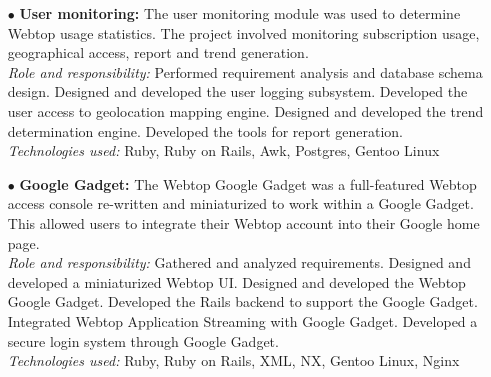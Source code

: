 \documentclass{scrartcl}
\begin{document}
\begin{cv}{
\href{http://www.develmj.com}{}
}
{\begin{itemize}
{      Ruby on Rails based framework. Configured and integrated
      ejabberd with the Rails backend. Designed and developed the user
      chat access rights engine.}\\
    \vspace{0.5em}
    \textsl{Technologies used:} {\scriptsize Ruby, Ruby on Rails,
      ejabberd, JWChat, XML}
\newpage
  \item[\footnotesize$\bullet$] \textbf{User monitoring: }{\scriptsize The user monitoring module was used to determine
    Webtop usage statistics. The project involved monitoring subscription usage,
    geographical access, report and trend generation.}\\

\vspace{0.5em}
    \textsl{Role and responsibility:} {\scriptsize Performed requirement
      analysis and database schema design. Designed and developed the
      user logging subsystem. Developed the user access to geolocation
      mapping engine. Designed and developed the trend determination
      engine. Developed the tools for report generation.}\\

\vspace{0.5em}
    \textsl{Technologies used:} {\scriptsize Ruby, Ruby on Rails, Awk, Postgres, Gentoo Linux}
  \item[\footnotesize$\bullet$] \textbf{Google Gadget: }{\scriptsize The Webtop Google Gadget was a full-featured Webtop
    access console re-written and miniaturized to work within a Google Gadget.
    This allowed users to integrate their Webtop account into their Google home
    page.}\\
    \vspace{0.5em}
    \textsl{Role and responsibility:} {\scriptsize Gathered and analyzed
      requirements. Designed and developed a miniaturized Webtop
      UI. Designed and developed the Webtop Google Gadget. Developed
      the Rails backend to support the Google Gadget. Integrated
      Webtop Application Streaming with Google Gadget. Developed a
      secure login system through Google Gadget.}\\
    \vspace{0.5em}
    \textsl{Technologies used:} {\scriptsize Ruby, Ruby on Rails, XML, NX, Gentoo Linux,
    Nginx}
\end{itemize}
}

\vspace{1em}

\noindent{}
\vspace{0.5em}


\end{cv}
\end{document}
